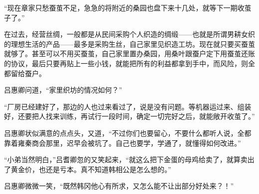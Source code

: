 “现在章家只愁蚕茧不足，急急的将附近的桑园也盘下来十几处，就等下一期收茧子了。”

在过去，经营丝绸，一般都是从民间采购个人织造的绸缎——也就是所谓男耕女织的理想生活的产品——最多是采购生丝，自己家里见织造工坊。现在就只要买蚕茧就够了。甚至可以不用买蚕茧，自己家里置办桑园，用桑叶跟蚕户定下用蚕茧还账的协议，最后只要再贴上一些小钱，就能把所有的利益都拿到手中，而风险，则全都留给蚕户。

吕惠卿问道，“家里织坊的情况如何？”

“厂房已经建好了，那边的人也过来看过了，说是没有问题。等机器运过来、组装好，还要把人找来训练，再试行一段时间，确定一切完好之后，就能敞开收茧了。”

吕惠卿状似满意的点点头，又道，“不过你们也要留心，不要什么都听人说，全都靠着雍秦商会那里，迟早会被坑了。自己也要学，学通了，就懂得如何改进。”

“小弟当然明白，”吕耆卿忽的又笑起来，“就这么把下金蛋的母鸡给卖了，就算卖出了黄金价，也还是亏本。真不知道韩相公是怎么想的。”

吕惠卿微微一笑，“既然韩冈他心有所求，又怎么能不让出部分好处来？！”
